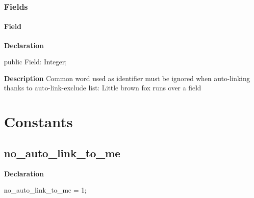 \documentclass{report}
\begin{document}
\subsubsection*{\large{\textbf{Fields}}\normalsize\hspace{1ex}\hfill}
\paragraph*{Field}\hspace*{\fill}

\begin{list}{}{
\setlength{\itemindent}{0cm}
\setlength{\listparindent}{0cm}
\setlength{\leftmargin}{\evensidemargin}
\addtolength{\leftmargin}{\tmplength}
\settowidth{\labelsep}{X}
\addtolength{\leftmargin}{\labelsep}
\setlength{\labelwidth}{\tmplength}
}
\begin{flushleft}
\item[\textbf{Declaration}\hfill]
\begin{ttfamily}
public Field: Integer;\end{ttfamily}


\end{flushleft}
\par
\item[\textbf{Description}]
Common word used as identifier must be ignored when auto{-}linking thanks to auto{-}link{-}exclude list: Little brown fox runs over a field

\end{list}
\section{Constants}
\subsection*{no{\_}auto{\_}link{\_}to{\_}me}
\begin{list}{}{
\setlength{\itemindent}{0cm}
\setlength{\listparindent}{0cm}
\setlength{\leftmargin}{\evensidemargin}
\addtolength{\leftmargin}{\tmplength}
\settowidth{\labelsep}{X}
\addtolength{\leftmargin}{\labelsep}
\setlength{\labelwidth}{\tmplength}
}
\begin{flushleft}
\item[\textbf{Declaration}\hfill]
\begin{ttfamily}
no{\_}auto{\_}link{\_}to{\_}me = 1;\end{ttfamily}


\end{flushleft}
\end{list}
\end{document}
